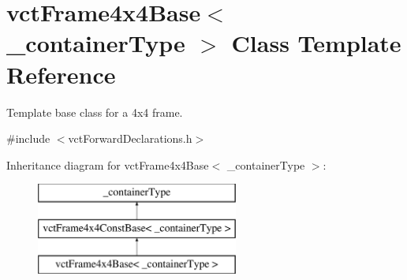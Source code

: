 \hypertarget{classvct_frame4x4_base}{\section{vct\-Frame4x4\-Base$<$ \-\_\-container\-Type $>$ Class Template Reference}
\label{classvct_frame4x4_base}
}


Template base class for a 4x4 frame.  




{\ttfamily \#include $<$vct\-Forward\-Declarations.\-h$>$}

Inheritance diagram for vct\-Frame4x4\-Base$<$ \-\_\-container\-Type $>$\-:\begin{figure}[H]
\begin{center}
\leavevmode
\includegraphics[height=3.000000cm]{d8/de5/classvct_frame4x4_base}
\end{center}
\end{figure}
